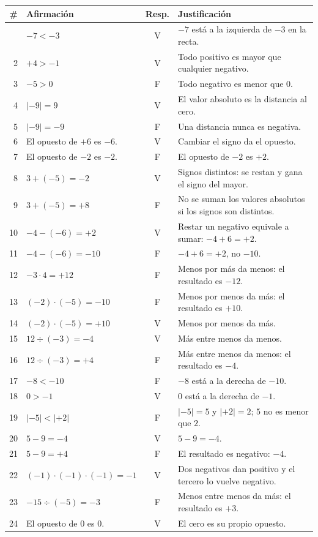 \documentclass[12pt, letterpaper]{article}
\newcommand{\abs}[1]{\lvert #1\rvert}
\begin{document}
{\footnotesize
\begin{longtable}{@{}r >{\raggedright\arraybackslash}p{5.4cm} c >{\raggedright\arraybackslash}p{5.4cm}@{}}
\toprule
\textbf{\#} & \textbf{Afirmación} & \textbf{Resp.} & \textbf{Justificación}\\
\midrule
\endhead
\bottomrule
\endfoot
1 & $-7<-3$ & V & $-7$ está a la izquierda de $-3$ en la recta.\\
2 & $+4>-1$ & V & Todo positivo es mayor que cualquier negativo.\\
3 & $-5>0$ & F & Todo negativo es menor que $0$.\\
4 & $\abs{-9}=9$ & V & El valor absoluto es la distancia al cero.\\
5 & $\abs{-9}=-9$ & F & Una distancia nunca es negativa.\\
6 & El opuesto de $+6$ es $-6$. & V & Cambiar el signo da el opuesto.\\
7 & El opuesto de $-2$ es $-2$. & F & El opuesto de $-2$ es $+2$.\\
8 & $3+(-5)=-2$ & V & Signos distintos: se restan y gana el signo del mayor.\\
9 & $3+(-5)=+8$ & F & No se suman los valores absolutos si los signos son distintos.\\
10 & $-4-(-6)=+2$ & V & Restar un negativo equivale a sumar: $-4+6=+2$.\\
11 & $-4-(-6)=-10$ & F & $-4+6=+2$, no $-10$.\\
12 & $-3\cdot 4=+12$ & F & Menos por más da menos: el resultado es $-12$.\\
13 & $(-2)\cdot(-5)=-10$ & F & Menos por menos da más: el resultado es $+10$.\\
14 & $(-2)\cdot(-5)=+10$ & V & Menos por menos da más.\\
15 & $12\div(-3)=-4$ & V & Más entre menos da menos.\\
16 & $12\div(-3)=+4$ & F & Más entre menos da menos: el resultado es $-4$.\\
17 & $-8<-10$ & F & $-8$ está a la derecha de $-10$.\\
18 & $0>-1$ & V & $0$ está a la derecha de $-1$.\\
19 & $\abs{-5}<\abs{+2}$ & F & $\abs{-5}=5$ y $\abs{+2}=2$; $5$ no es menor que $2$.\\
20 & $5-9=-4$ & V & $5-9=-4$.\\
21 & $5-9=+4$ & F & El resultado es negativo: $-4$.\\
22 & $(-1)\cdot(-1)\cdot(-1)=-1$ & V & Dos negativos dan positivo y el tercero lo vuelve negativo.\\
23 & $-15\div(-5)=-3$ & F & Menos entre menos da más: el resultado es $+3$.\\
24 & El opuesto de $0$ es $0$. & V & El cero es su propio opuesto.\\
\end{longtable}
}
\end{document}
